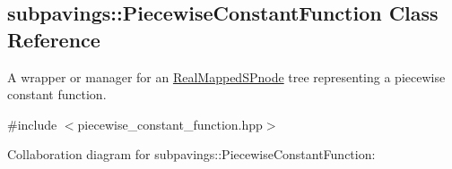 \hypertarget{classsubpavings_1_1PiecewiseConstantFunction}{\subsection{subpavings\-:\-:\-Piecewise\-Constant\-Function \-Class \-Reference}
\label{classsubpavings_1_1PiecewiseConstantFunction}
}


\-A wrapper or manager for an \hyperlink{classsubpavings_1_1RealMappedSPnode}{\-Real\-Mapped\-S\-Pnode} tree representing a piecewise constant function.  




{\ttfamily \#include $<$piecewise\-\_\-constant\-\_\-function.\-hpp$>$}



\-Collaboration diagram for subpavings\-:\-:\-Piecewise\-Constant\-Function\-:
